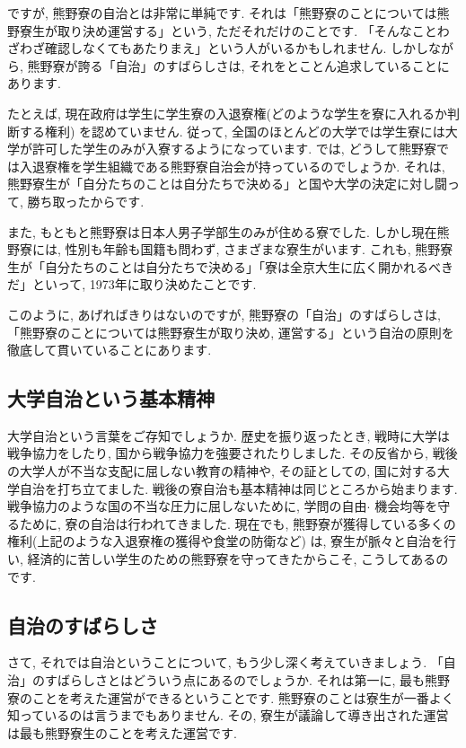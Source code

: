 \documentclass[10pt,b5jsbook,dvips,dvipdfmx,openany]{jsbook}
\theoremstyle{definition}
\begin{document}
	ですが, 熊野寮の自治とは非常に単純です. それは「熊野寮のことについては熊野寮生が取り決め運営する」という, ただそれだけのことです.
    「そんなことわざわざ確認しなくてもあたりまえ」という人がいるかもしれません. しかしながら, 熊野寮が誇る「自治」のすばらしさは, それをとことん追求していることにあります.

	たとえば, 現在政府は学生に学生寮の入退寮権(どのような学生を寮に入れるか判断する権利) を認めていません. 従って, 全国のほとんどの大学では学生寮には大学が許可した学生のみが入寮するようになっています. では, どうして熊野寮では入退寮権を学生組織である熊野寮自治会が持っているのでしょうか. それは, 熊野寮生が「自分たちのことは自分たちで決める」と国や大学の決定に対し闘って, 勝ち取ったからです.

	また, もともと熊野寮は日本人男子学部生のみが住める寮でした. しかし現在熊野寮には, 性別も年齢も国籍も問わず, さまざまな寮生がいます. これも, 熊野寮生が「自分たちのことは自分たちで決める」「寮は全京大生に広く開かれるべきだ」といって, 1973年に取り決めたことです.

	このように, あげればきりはないのですが, 熊野寮の「自治」のすばらしさは, 「熊野寮のことについては熊野寮生が取り決め, 運営する」という自治の原則を徹底して貫いていることにあります.

		\subsection{大学自治という基本精神}

		大学自治という言葉をご存知でしょうか. 歴史を振り返ったとき, 戦時に大学は戦争協力をしたり, 国から戦争協力を強要されたりしました. その反省から, 戦後の大学人が不当な支配に屈しない教育の精神や, その証としての, 国に対する大学自治を打ち立てました. 戦後の寮自治も基本精神は同じところから始まります. 戦争協力のような国の不当な圧力に屈しないために, 学問の自由$ \cdot $ 機会均等を守るために, 寮の自治は行われてきました. 現在でも, 熊野寮が獲得している多くの権利(上記のような入退寮権の獲得や食堂の防衛など) は, 寮生が脈々と自治を行い, 経済的に苦しい学生のための熊野寮を守ってきたからこそ, こうしてあるのです.

		\subsection{自治のすばらしさ}

		さて, それでは自治ということについて, もう少し深く考えていきましょう. 「自治」のすばらしさとはどういう点にあるのでしょうか. それは第一に, 最も熊野寮のことを考えた運営ができるということです. 熊野寮のことは寮生が一番よく知っているのは言うまでもありません. その, 寮生が議論して導き出された運営は最も熊野寮生のことを考えた運営です.
\end{document}
